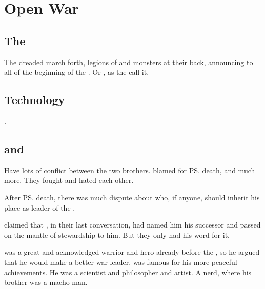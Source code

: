 \section{Open War}









\subsection{The \secondbanewar}
\index{\secondbanewar}
The dreaded \satharioth{} march forth, legions of \banes{} and monsters at their back, 
announcing to all of \Miith{} the beginning of the \secondbanewar.
Or , as the \resphain{} call it. 









\subsection{Technology}
.











\subsection{\Ishnaruchaefir{} and \Secherdamon}
Have lots of conflict between the two brothers. 
\Secherdamon{} blamed \Ishnaruchaefir{} for \ps{\Nexagglachel} death, and much more. 
They fought and hated each other. 

After \ps{\Nexagglachel} death, there was much dispute about who, if anyone, should inherit his place as leader of the \dragons{}. 

\Ishnaruchaefir{} claimed that \Nexagglachel, in their last conversation, had named him his successor and passed on the mantle of stewardship to him. 
But they only had his word for it. 

\Ishnaruchaefir{} was a great and acknowledged warrior and hero already before the \secondbanewar, so he argued that he would make a better war leader. 
\Secherdamon{} was famous for his more peaceful achievements. 
He was a scientist and philosopher and artist.
A nerd, where his brother was a macho-man. 

